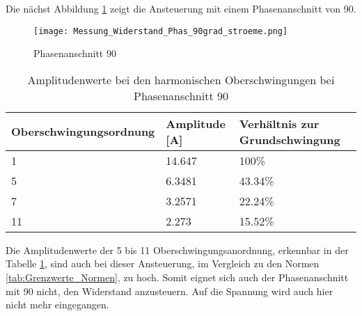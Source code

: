 Die nächst Abbildung \ref{fig:Mess_Widerstand_Phas_90grad_stroeme} zeigt die Ansteuerung mit einem Phasenanschnitt von 90\textdegree \hspace{0.02cm}. 

\begin{figure}[ht!]
	\centering
	\texttt{[image: Messung\_Widerstand\_Phas\_90grad\_stroeme.png]}	
	\caption{Phasenanschnitt 90\textdegree}\label{fig:Mess_Widerstand_Phas_90grad_stroeme}
\end{figure}

\begin{table}[ht!]
	\centering
	\begin{tabular}{|l|l|l|}
		\hline
		Oberschwingungsordnung 	& Amplitude [A] & Verhältnis zur Grundschwingung	\\ \hline
		1       				& 14.647   		& 100\%								\\ \hline
		5      					& 6.3481    	& 43.34\%							\\ \hline
		7      					& 3.2571    	& 22.24\%							\\ \hline
		11      				& 2.273    		& 15.52\%							\\ \hline
	\end{tabular}
	\caption{Amplitudenwerte bei den harmonischen Oberschwingungen bei Phasenanschnitt 90\textdegree}\label{tab:Phas_90_Stroeme}
\end{table}

Die Amplitudenwerte der 5 bis 11 Oberschwingungsanordnung, erkennbar in der Tabelle \ref{tab:Phas_90_Stroeme}, sind auch bei dieser Ansteuerung, im Vergleich zu den Normen \ref{tab:Grenzwerte_Normen}, zu hoch. Somit eignet sich auch der Phasenanschnitt mit 90\textdegree \hspace{0.02cm} nicht, den Widerstand anzusteuern. Auf die Spannung wird auch hier nicht mehr eingegangen. 



